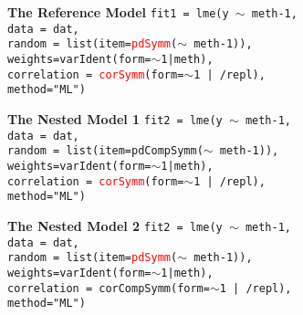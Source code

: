 \documentclass[compress]{beamer}        %
\makeatletter
\newcommand{\tcb}{\textcolor{beamer@blendedblue}}
\newcommand{\tcr}{\textcolor{red}}
\makeatother
\begin{document}
\begin{frame}[fragile]{\bf \tcb{The Reference Model}}
\texttt{fit1 = lme(y $\sim$ meth-1,\\
   \hspace{0.6cm} data = dat,\\
   \hspace{0.6cm} random = list(item=\tcr{pdSymm}($\sim$ meth-1)), \\
   \hspace{0.6cm} weights=varIdent(form=$\sim$1|meth),\\
   \hspace{0.6cm} correlation = \tcr{corSymm}(form=$\sim$1 | /repl),\\
   \hspace{0.6cm} method="ML")}
\end{frame}

\begin{frame}[fragile]{\bf \tcb{The Nested Model 1}}
\texttt{fit2 = lme(y $\sim$ meth-1,\\
   \hspace{0.6cm} data = dat,\\
   \hspace{0.6cm} random = list(item=\tcb{pdCompSymm}($\sim$ meth-1)), \\
   \hspace{0.6cm} weights=varIdent(form=$\sim$1|meth),\\
   \hspace{0.6cm} correlation = \tcr{corSymm}(form=$\sim$1 | /repl),\\
   \hspace{0.6cm} method="ML")}

\end{frame}
\begin{frame}[fragile]{\bf \tcb{The Nested Model 2}}
\texttt{fit2 = lme(y $\sim$ meth-1,\\
   \hspace{0.6cm} data = dat,\\
   \hspace{0.6cm} random = list(item=\tcr{pdSymm}($\sim$ meth-1)), \\
   \hspace{0.6cm} weights=varIdent(form=$\sim$1|meth),\\
   \hspace{0.6cm} correlation = \tcb{corCompSymm}(form=$\sim$1 | /repl),\\
   \hspace{0.6cm} method="ML")}
\end{frame}
\end{document}
